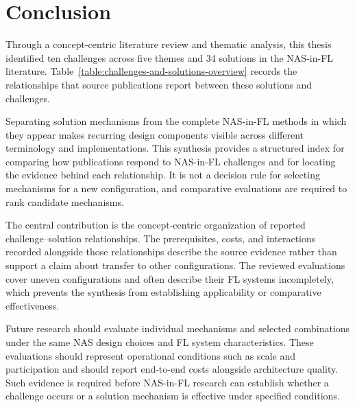 \chapter{Conclusion}\label{chapter:conclusion}

Through a concept-centric literature review and thematic analysis, this thesis identified ten challenges across five themes and 34 solutions in the NAS-in-FL literature. Table~\ref{table:challenges-and-solutions-overview} records the relationships that source publications report between these solutions and challenges.

Separating solution mechanisms from the complete NAS-in-FL methods in which they appear makes recurring design components visible across different terminology and implementations. This synthesis provides a structured index for comparing how publications respond to NAS-in-FL challenges and for locating the evidence behind each relationship. It is not a decision rule for selecting mechanisms for a new configuration, and comparative evaluations are required to rank candidate mechanisms.

The central contribution is the concept-centric organization of reported challenge--solution relationships. The prerequisites, costs, and interactions recorded alongside those relationships describe the source evidence rather than support a claim about transfer to other configurations. The reviewed evaluations cover uneven configurations and often describe their FL systems incompletely, which prevents the synthesis from establishing applicability or comparative effectiveness.

Future research should evaluate individual mechanisms and selected combinations under the same NAS design choices and FL system characteristics. These evaluations should represent operational conditions such as scale and participation and should report end-to-end costs alongside architecture quality. Such evidence is required before NAS-in-FL research can establish whether a challenge occurs or a solution mechanism is effective under specified conditions.
